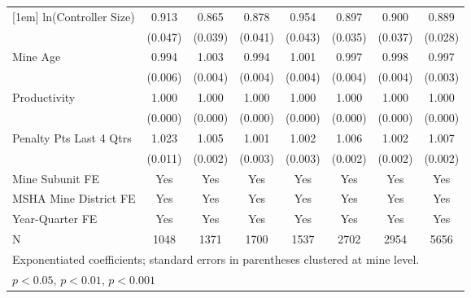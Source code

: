 {\begin{tabular}{l*{7}{c}}
[1em]
ln(Controller Size)      &       0.913         &       0.865\sym{**} &       0.878\sym{**} &       0.954         &       0.897\sym{**} &       0.900\sym{*}  &       0.889\sym{***}\\
                         &     (0.047)         &     (0.039)         &     (0.041)         &     (0.043)         &     (0.035)         &     (0.037)         &     (0.028)         \\
[1em]
Mine Age                 &       0.994         &       1.003         &       0.994         &       1.001         &       0.997         &       0.998         &       0.997         \\
                         &     (0.006)         &     (0.004)         &     (0.004)         &     (0.004)         &     (0.004)         &     (0.004)         &     (0.003)         \\
[1em]
Productivity             &       1.000\sym{*}  &       1.000         &       1.000         &       1.000         &       1.000\sym{*}  &       1.000         &       1.000         \\
                         &     (0.000)         &     (0.000)         &     (0.000)         &     (0.000)         &     (0.000)         &     (0.000)         &     (0.000)         \\
[1em]
Penalty Pts Last 4 Qtrs  &       1.023\sym{*}  &       1.005\sym{*}  &       1.001         &       1.002         &       1.006\sym{**} &       1.002         &       1.007\sym{***}\\
                         &     (0.011)         &     (0.002)         &     (0.003)         &     (0.003)         &     (0.002)         &     (0.002)         &     (0.002)         \\
[1em]
Mine Subunit FE          &         Yes         &         Yes         &         Yes         &         Yes         &         Yes         &         Yes         &         Yes         \\
[1em]
MSHA Mine District FE    &         Yes         &         Yes         &         Yes         &         Yes         &         Yes         &         Yes         &         Yes         \\
[1em]
Year-Quarter FE          &         Yes         &         Yes         &         Yes         &         Yes         &         Yes         &         Yes         &         Yes         \\
\hline
N                        &        1048         &        1371         &        1700         &        1537         &        2702         &        2954         &        5656         \\
\hline\hline
\multicolumn{8}{l}{\footnotesize Exponentiated coefficients; standard errors in parentheses clustered at mine level.}\\
\multicolumn{8}{l}{\footnotesize \sym{*} \(p<0.05\), \sym{**} \(p<0.01\), \sym{***} \(p<0.001\)}\\
\end{tabular}
}
